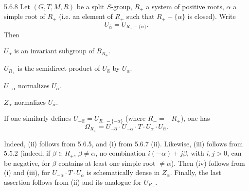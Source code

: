 \begin{corollary}{5.6.8}\label{XXII.5.6.8}
Let $(G,T,M,R)$ be a split $S$-group, $R_+$ a system of positive roots, $\alpha$ a simple root of $R_+$ (i.e. an element of $R_+$ such that $R_+-\{\alpha\}$ is closed). Write
\[
U_{\widehat\alpha}=U_{R_+-\{\alpha\}}.
\]
Then
\begin{enumeratei}
\item $U_{\widehat\alpha}$ is an invariant subgroup of $B_{R_+}$.
\item $U_{R_+}$ is the semidirect product of $U_{\widehat\alpha}$ by $U_\alpha$.
\item $U_{-\alpha}$ normalizes $U_{\widehat\alpha}$.
\item $Z_\alpha$ normalizes $U_{\widehat\alpha}$.
\end{enumeratei}
If one similarly defines $U_{-\widehat\alpha}=U_{R_--\{-\alpha\}}$ (where $R_-=-R_+$), one has
\[
\Omega_{R_+}=U_{-\widehat\alpha}\cdot U_{-\alpha}\cdot T\cdot U_\alpha\cdot U_{\widehat\alpha}.
\]
\end{corollary}
Indeed, (ii) follows from 5.6.5, and (i) from 5.6.7 (ii). Likewise, (iii) follows from 5.5.2 (indeed, if $\beta\in R_+$, $\beta\ne\alpha$, no combination $i(-\alpha)+j\beta$, with $i,j>0$, can be negative, for $\beta$ contains at least one simple root $\ne\alpha$). Then (iv) follows from (i) and (iii), for $U_{-\alpha}\cdot T\cdot U_\alpha$ is schematically dense in $Z_\alpha$. Finally, the last assertion follows from (ii) and its analogue for $U_{R_-}$.


